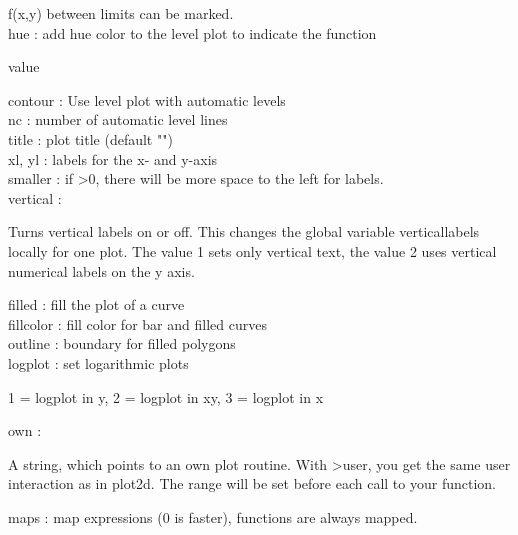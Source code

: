 \documentclass[a4paper,10pt]{article}
\begin{document}
\begin{eulernotebook}
\begin{eulercomment}
\begin{eulercomment}
\begin{eulercomment}
\begin{eulercomment}
\begin{eulercomment}
f(x,y) between limits can be marked.
\\
hue       : add hue color to the level plot to indicate the function\\
\end{eulercomment}
\begin{eulerttcomment}
            value
\end{eulerttcomment}
\begin{eulercomment}
contour   : Use level plot with automatic levels\\
nc        : number of automatic level lines\\
title     : plot title (default "")\\
xl, yl    : labels for the x- and y-axis\\
smaller   : if \textgreater{}0, there will be more space to the left for labels.\\
vertical  :\\
\end{eulercomment}
\begin{eulerttcomment}
  Turns vertical labels on or off. This changes the global variable
  verticallabels locally for one plot. The value 1 sets only vertical
  text, the value 2 uses vertical numerical labels on the y axis.
\end{eulerttcomment}
\begin{eulercomment}
filled    : fill the plot of a curve\\
fillcolor : fill color for bar and filled curves\\
outline   : boundary for filled polygons\\
logplot   : set logarithmic plots\\
\end{eulercomment}
\begin{eulerttcomment}
            1 = logplot in y,
            2 = logplot in xy,
            3 = logplot in x
\end{eulerttcomment}
\begin{eulercomment}
own       :\\
\end{eulercomment}
\begin{eulerttcomment}
  A string, which points to an own plot routine. With >user, you get
  the same user interaction as in plot2d. The range will be set
  before each call to your function.
\end{eulerttcomment}
\begin{eulercomment}
maps      : map expressions (0 is faster), functions are always mapped.\\

\end{eulercomment}
\end{eulercomment}
\end{eulercomment}
\end{eulercomment}
\end{eulercomment}
\end{eulernotebook}
\end{document}
